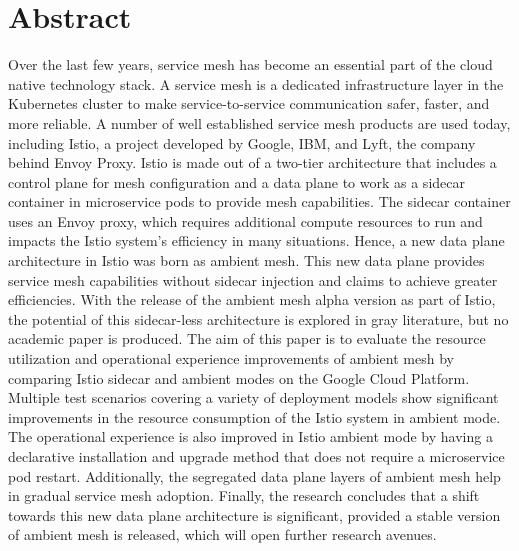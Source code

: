 \section*{Abstract}
Over the last few years, service mesh has become an essential part of the cloud native technology stack. A service mesh is a dedicated infrastructure layer in the Kubernetes cluster to make service-to-service communication safer, faster, and more reliable. A number of well established service mesh products are used today, including Istio, a project developed by Google, IBM, and Lyft, the company behind Envoy Proxy. Istio is made out of a two-tier architecture that includes a control plane for mesh configuration and a data plane to work as a sidecar container in microservice pods to provide mesh capabilities. The sidecar container uses an Envoy proxy, which requires additional compute resources to run and impacts the Istio system's efficiency in many situations. Hence, a new data plane architecture in Istio was born as ambient mesh. This new data plane provides service mesh capabilities without sidecar injection and claims to achieve greater efficiencies. With the release of the ambient mesh alpha version as part of Istio, the potential of this sidecar-less architecture is explored in gray literature, but no academic paper is produced. The aim of this paper is to evaluate the resource utilization and operational experience improvements of ambient mesh by comparing Istio sidecar and ambient modes on the Google Cloud Platform. Multiple test scenarios covering a variety of deployment models show significant improvements in the resource consumption of the Istio system in ambient mode. The operational experience is also improved in Istio ambient mode by having a declarative installation and upgrade method that does not require a microservice pod restart. Additionally, the segregated data plane layers of ambient mesh help in gradual service mesh adoption. Finally, the research concludes that a shift towards this new data plane architecture is significant, provided a stable version of ambient mesh is released, which will open further research avenues.